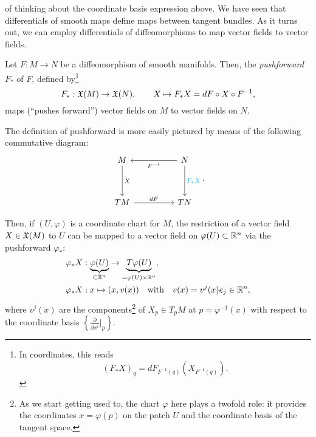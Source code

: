 of thinking about the coordinate basis expression above.
We have seen that differentials of smooth maps define maps between tangent bundles.
As it turns out, we can employ differentials of diffeomorphisms to map vector fields to vector fields.

\begin{definition}
  Let $F:M\to N$ be a diffeomorphism of smooth manifolds.
  Then, the \emph{pushforward} $F_*$ of $F$, defined by\footnote{In coordinates, this reads\begin{equation}
      (F_* X)_q = dF_{F^{-1}(q)}(X_{F^{-1}(q)}).
    \end{equation}}
  \begin{equation}\label{eq:pfvf}
    F_*: \mathfrak{X}(M) \to \mathfrak{X}(N),\qquad
    X \mapsto F_* X = d F \circ X \circ F^{-1},
  \end{equation}
  maps (``pushes forward'') vector fields on $M$ to vector fields on $N$.
\end{definition}

The definition of pushforward is more easily pictured by means of the following commutative diagram:
\begin{equation}
  \begin{tikzcd}[row sep=huge, column sep=huge]
    M \arrow[d, "X"]
    & N \arrow[l, "F^{-1}"] \arrow[d, "F_*X" cyan]\\
    TM \arrow[r, "d F"]
    & TN
  \end{tikzcd}.
\end{equation}

Then, if $(U, \varphi)$ is a coordinate chart for $M$, the restriction of a vector field $X\in\mathfrak{X}(M)$ to $U$ can be mapped to a vector field on $\varphi(U)\subset\mathbb{R}^n$ via the pushforward $\varphi_*$:
\begin{align}
  \varphi_* X & : \LaTeXunderbrace{\varphi(U)}_{\subset\R^n} \to \LaTeXunderbrace{T \varphi(U)}_{=\varphi(U)\times\R^n}, \\
  \varphi_* X & : x\mapsto (x,v(x)) \quad\mbox{with}\quad v(x) = v^j(x)e_j \in \R^n,
\end{align}
where $v^j(x)$ are the components\footnote{As we start getting used to, the chart $\varphi$ here plays a twofold role: it provides the coordinates $x=\varphi(p)$ on the patch $U$ and the coordinate basis of the tangent space.} of $X_p\in T_p M$ at $p=\varphi^{-1}(x)$ with respect to the coordinate basis $\left\{\frac{\partial}{\partial x^i}\big|_p\right\}$.

